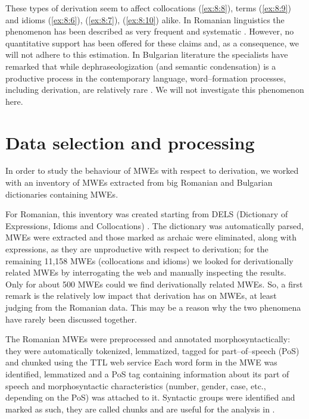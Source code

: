 \documentclass[output=paper]{langsci/langscibook}
\begin{document}
These types of derivation seem to affect  collocations (\ref{ex:8:8}),  terms (\ref{ex:8:9}) and 
idioms (\ref{ex:8:6}), (\ref{ex:8:7}), (\ref{ex:8:10})  alike. In Romanian linguistics the phenomenon has
been described as very frequent and systematic \citep{groza2011}. However,
no quantitative support has been offered for these claims and, as a
consequence, we will not adhere to this estimation. In Bulgarian
literature the specialists have remarked that while dephraseologization
(and semantic condensation) is a productive process in the contemporary
language, word–formation processes, including derivation, are
relatively rare \citep{blagoeva2011}. We will not investigate this
phenomenon here.


\section{Data selection and processing}
\label{dataselection}
In order to study the behaviour of MWEs with respect to derivation, we
worked with an inventory of MWEs extracted from big Romanian and
Bulgarian dictionaries containing MWEs.



For Romanian, this inventory was created starting from DELS (Dictionary
of Expressions, Idioms and Collocations) \citep{muaruanduc2010}. The
dictionary was automatically parsed, MWEs were extracted and those
marked as archaic were eliminated, along with expressions, as they are
unproductive with respect to derivation; for the remaining 11,158 MWEs
(collocations and idioms) we looked for derivationally related MWEs by
interrogating the web and manually inspecting the results. Only for
about 500 MWEs could we find derivationally related MWEs. So, a first
remark is the relatively low impact that derivation has on MWEs, at
least judging from the Romanian data. This may be a reason why the two
phenomena have rarely been discussed together.



The Romanian MWEs were preprocessed and annotated morphosyntactically:
they were automatically tokenized, lemmatized, tagged for
part–of–speech (PoS) and chunked using the TTL web service \citep{ion2007}
Each word form in the MWE was identified, lemmatized and a PoS tag
containing information about its part of speech and morphosyntactic
characteristics (number, gender, case, etc., depending on the PoS) was
attached to it. Syntactic groups were identified and marked as such, they 
 are called chunks and are useful for the analysis in  .
\end{document}
